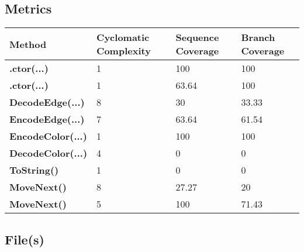 \documentclass[a4paper,10pt]{article}
\begin{document}
\subsection{Metrics}
\begin{longtable}[l]{|l|l|l|l|}
\hline
\textbf{Method} & \textbf{Cyclomatic Complexity} & \textbf{Sequence Coverage} & \textbf{Branch Coverage}\\
\hline
\textbf{.ctor(...)} & 1 & 100 & 100\\
\hline
\textbf{.ctor(...)} & 1 & 63.64 & 100\\
\hline
\textbf{DecodeEdge(...)} & 8 & 30 & 33.33\\
\hline
\textbf{EncodeEdge(...)} & 7 & 63.64 & 61.54\\
\hline
\textbf{EncodeColor(...)} & 1 & 100 & 100\\
\hline
\textbf{DecodeColor(...)} & 4 & 0 & 0\\
\hline
\textbf{ToString()} & 1 & 0 & 0\\
\hline
\textbf{MoveNext()} & 8 & 27.27 & 20\\
\hline
\textbf{MoveNext()} & 5 & 100 & 71.43\\
\hline
\end{longtable}
\subsection{File(s)}
\end{document}
